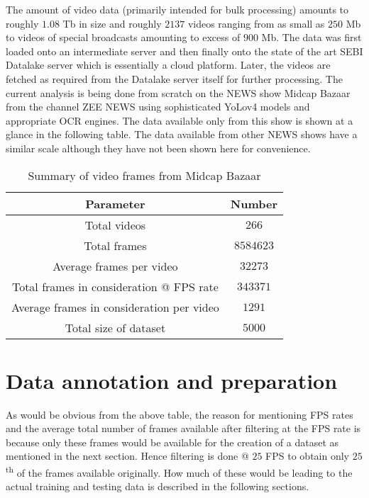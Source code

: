 The amount of video data (primarily intended for bulk processing) amounts to roughly $1.08$ Tb in size and roughly $2137$ videos ranging from as small as $250$ Mb to videos of special broadcasts amounting to excess of $900$ Mb. The data was first loaded onto an intermediate server and then finally onto the state of the art SEBI Datalake server which is essentially a cloud platform. Later, the videos are fetched as required from the Datalake server itself for further processing. The current analysis is being done from scratch on the NEWS show Midcap Bazaar from the channel ZEE NEWS using sophisticated YoLov4 models and appropriate OCR engines. The data available only from this show is shown at a glance in the following table. The data available from other NEWS shows have a similar scale although they have not been shown here for convenience.

\begin{table}[h]
 \def\arraystretch{1.5}
 \centering
 \caption{Summary of video frames from Midcap Bazaar}
 \begin{tabular}{|c|c|}
  \hline
  Parameter & Number\\
  \hline
  Total videos & $266$                   \\
  \hline
  Total frames & $8584623$                   \\
  \hline
  Average frames per video & $32273$                   \\
  \hline
  Total frames in consideration @ FPS rate & $343371$                   \\
  \hline
  Average frames in consideration per video & $1291$                   \\
  \hline
  Total size of dataset & $5000$                   \\
  \hline
 \end{tabular}
 \label{tab:vid_data_tab}
\end{table}

\section{Data annotation and preparation}

As would be obvious from the above table, the reason for mentioning FPS rates and the average total number of frames available after filtering at the FPS rate is because only these frames would be available for the creation of a dataset as mentioned in the next section. Hence filtering is done @ $25$ FPS to obtain only $25$\textsuperscript{th} of the frames available originally. How much of these would be leading to the actual training and testing data is described in the following sections. \par

